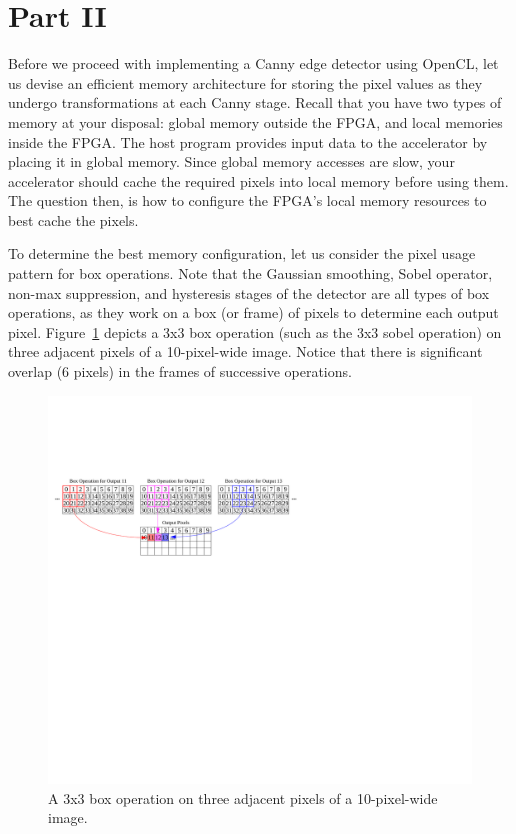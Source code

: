 \documentclass[epsfig,10pt,fullpage]{article}
\begin{document}
\section*{Part II}

Before we proceed with implementing a Canny edge detector using OpenCL, let us devise an efficient memory architecture for
storing the pixel values as they undergo transformations at each Canny stage. Recall that you have two types of memory at your disposal: global memory outside 
the FPGA, and local memories inside the FPGA. The host program provides input data to the accelerator by placing it in global memory.
Since global memory accesses are slow, your accelerator should cache the required pixels into local memory before using them.
The question then, is how to configure the FPGA's local memory resources to best cache the pixels. 

To determine the best memory configuration, let us consider the pixel usage pattern for box operations.
Note that the Gaussian smoothing, Sobel operator, non-max suppression, and hysteresis stages of the detector are all 
types of box operations, as they work on a box (or frame) of pixels to determine each output pixel. 
Figure~\ref{fig:box_operation} depicts a 3x3 box operation (such as the 3x3 sobel operation) on three adjacent pixels of a 10-pixel-wide image. 
Notice that there is significant overlap (6 pixels) in the frames of successive operations.

\begin{figure}[H]
   \begin{center}
       \includegraphics[scale = 0.85]{figures/fig_box_operation}
   \end{center}
   \caption{A 3x3 box operation on three adjacent pixels of a 10-pixel-wide image.}
	\label{fig:box_operation}
\end{figure}
\end{document}
